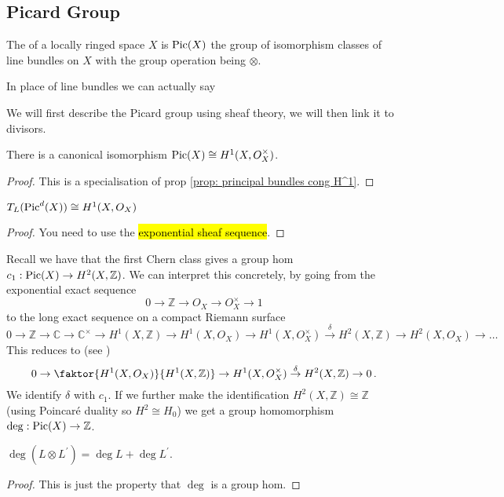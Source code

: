 \documentclass{article}
\begin{document}
\subsection{Picard Group}\label{subsec:Picard Group}

\begin{definition}
	The  of a locally ringed space $X$ is $\operatorname{Pic}(X)$ the group of isomorphism classes of line bundles on $X$ with the group operation being $\otimes$. 
\end{definition}

\begin{remark}
	In place of line bundles we can actually say  
\end{remark}

We will first describe the Picard group using sheaf theory, we will then link it to divisors. 

\begin{prop}
	There is a canonical isomorphism $\operatorname{Pic}(X) \cong H^1(X, O_X^\times)$. 
\end{prop}
\begin{proof}
	This is a specialisation of prop \ref{prop: principal bundles cong H^1}.
\end{proof}
\begin{corollary}
	$T_L(\operatorname{Pic}^d(X)) \cong H^1(X,O_X)$
\end{corollary}
\begin{proof}
	You need to use the \hl{exponential sheaf sequence}. 
\end{proof}

Recall we have that the first Chern class gives a group hom $c_1 : \operatorname{Pic}(X) \to H^2(X,\mathbb{Z})$. We can interpret this concretely, by going from the exponential exact sequence 
\[
0 \to \mathbb{Z} \to O_X \to O_X^\times \to 1 
\] 
to the long exact sequence on a compact Riemann surface 
\[
0 \to \mathbb{Z} \to \mathbb{C} \to \mathbb{C}^\times \to H^1(X,\mathbb{Z}) \to H^1(X,O_X) \to H^1(X,O_X^\times) \overset{\delta}{\to} H^2(X,\mathbb{Z}) \to H^2(X,O_X) \to \dots 
\]
This reduces to (see \cite{Hitchin1999})
\[
0 \to \faktor{H^1(X,O_X)}{H^1(X,\mathbb{Z})} \to H^1(X,O_X^\times) \overset{\delta}{\to} H^2(X,\mathbb{Z}) \to 0 \, .
\]
We identify $\delta$ with $c_1$. If we further make the identification $H^2(X,\mathbb{Z}) \cong \mathbb{Z}$ (using Poincar\'e duality so $H^2 \cong H_0$) we get a group homomorphism $\deg:\operatorname{Pic}(X) \to \mathbb{Z}$. 
\begin{lemma}
	$\deg(L \otimes L^\prime) = \deg L + \deg L^\prime$.
\end{lemma}
\begin{proof}
	This is just the property that $\deg$ is a group hom. 
\end{proof}
\end{document}
